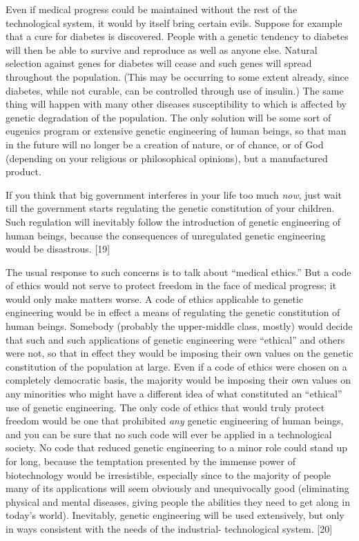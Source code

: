  Even if medical progress could be maintained without the rest of the technological system, it would by itself bring certain evils. Suppose for example that a cure for diabetes is discovered. People with a genetic tendency to diabetes will then be able to survive and reproduce as well as anyone else. Natural selection against genes for diabetes will cease and such genes will spread throughout the population. (This may be occurring to some extent already, since diabetes, while not curable, can be controlled through use of insulin.) The same thing will happen with many other diseases susceptibility to which is affected by genetic degradation of the population. The only solution will be some sort of eugenics program or extensive genetic engineering of human beings, so that man in the future will no longer be a creation of nature, or of chance, or of God (depending on your religious or philosophical opinions), but a manufactured product.

 If you think that big government interferes in your life too much {\em now}, just wait till the government starts regulating the genetic constitution of your children. Such regulation will inevitably follow the introduction of genetic engineering of human beings, because the consequences of unregulated genetic engineering would be disastrous. [19]

 The usual response to such concerns is to talk about “medical ethics.” But a code of ethics would not serve to protect freedom in the face of medical progress; it would only make matters worse. A code of ethics applicable to genetic engineering would be in effect a means of regulating the genetic constitution of human beings. Somebody (probably the upper-middle class, mostly) would decide that such and such applications of genetic engineering were “ethical” and others were not, so that in effect they would be imposing their own values on the genetic constitution of the population at large. Even if a code of ethics were chosen on a completely democratic basis, the majority would be imposing their own values on any minorities who might have a different idea of what constituted an “ethical” use of genetic engineering. The only code of ethics that would truly protect freedom would be one that prohibited {\em any} genetic engineering of human beings, and you can be sure that no such code will ever be applied in a technological society. No code that reduced genetic engineering to a minor role could stand up for long, because the temptation presented by the immense power of biotechnology would be irresistible, especially since to the majority of people many of its applications will seem obviously and unequivocally good (eliminating physical and mental diseases, giving people the abilities they need to get along in today’s world). Inevitably, genetic engineering will be used extensively, but only in ways consistent with the needs of the industrial- technological system. [20]

